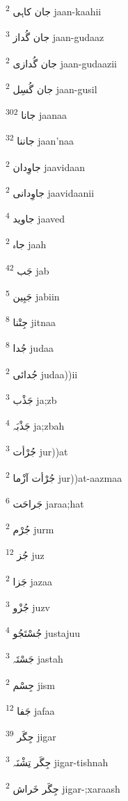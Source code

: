 \documentclass[12pt]{article}
\begin{document}
\begin{RTL}
\begin{multicols}{5}
{\ur جان کاہی}   \textsuperscript{2} jaan-kaahii

{\ur جان گُداز}   \textsuperscript{3} jaan-gudaaz

{\ur جان گُدازی}   \textsuperscript{2} jaan-gudaazii

{\ur جان گُسِل}   \textsuperscript{2} jaan-gusil

{\ur جانا}   \textsuperscript{302} jaanaa

{\ur جاننا}   \textsuperscript{32} jaan'naa

{\ur جاوِدان}   \textsuperscript{2} jaavidaan

{\ur جاوِدانی}   \textsuperscript{2} jaavidaanii

{\ur جاوید}   \textsuperscript{4} jaaved

{\ur جاہ}   \textsuperscript{2} jaah

{\ur جَب}   \textsuperscript{42} jab

{\ur جَبِین}   \textsuperscript{5} jabiin

{\ur جِتْنا}   \textsuperscript{8} jitnaa

{\ur جُدا}   \textsuperscript{8} judaa

{\ur جُدائی}   \textsuperscript{2} judaa))ii

{\ur جَذْب}   \textsuperscript{3} ja;zb

{\ur جَذْبَہ}   \textsuperscript{4} ja;zbah

{\ur جُرْأت}   \textsuperscript{3} jur))at

{\ur جُرْأت آزْما}   \textsuperscript{2} jur))at-aazmaa

{\ur جَراحَت}   \textsuperscript{6} jaraa;hat

{\ur جُرْم}   \textsuperscript{2} jurm

{\ur جُز}   \textsuperscript{12} juz

{\ur جَزا}   \textsuperscript{2} jazaa

{\ur جُزْو}   \textsuperscript{3} juzv

{\ur جُسْتَجُو}   \textsuperscript{4} justajuu

{\ur جَسْتَہ}   \textsuperscript{3} jastah

{\ur جِسْم}   \textsuperscript{2} jism

{\ur جَفا}   \textsuperscript{12} jafaa

{\ur جِگَر}   \textsuperscript{39} jigar

{\ur جِگَر تِشْنَہ}   \textsuperscript{3} jigar-tishnah

{\ur جِگَر خَراش}   \textsuperscript{2} jigar-;xaraash


\end{multicols}
\end{RTL}
\end{document}
